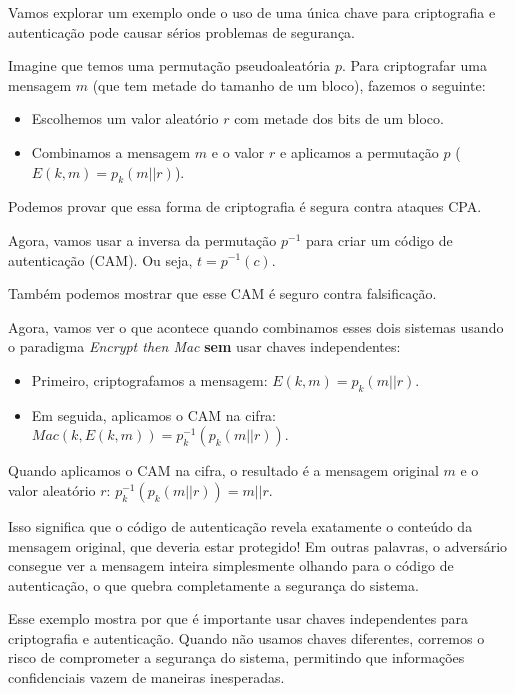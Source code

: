 \begin{example}
Vamos explorar um exemplo onde o uso de uma única chave para criptografia e autenticação pode causar sérios problemas de segurança.

Imagine que temos uma permutação pseudoaleatória $p$.
Para criptografar uma mensagem $m$ (que tem metade do tamanho de um bloco), fazemos o seguinte:
\begin{itemize}
\item Escolhemos um valor aleatório $r$ com metade dos bits de um bloco.
\item Combinamos a mensagem $m$ e o valor $r$ e aplicamos a permutação $p$ ($E(k, m) = p_k(m || r)$).
\end{itemize}

Podemos provar que essa forma de criptografia é segura contra ataques CPA.

Agora, vamos usar a inversa da permutação $p^{-1}$ para criar um código de autenticação (CAM).
Ou seja, $t = p^{-1}(c)$.

Também podemos mostrar que esse CAM é seguro contra falsificação.

Agora, vamos ver o que acontece quando combinamos esses dois sistemas usando o paradigma \textit{Encrypt then Mac} \textbf{sem} usar chaves independentes:

\begin{itemize}
    \item Primeiro, criptografamos a mensagem: $E(k, m) = p_k(m || r)$.
    \item Em seguida, aplicamos o CAM na cifra: $Mac(k, E(k, m)) = p_k^{-1}(p_k(m || r))$.
\end{itemize}

Quando aplicamos o CAM na cifra, o resultado é a mensagem original $m$ e o valor aleatório $r$: $p_k^{-1}(p_k(m || r)) = m || r$.

Isso significa que o código de autenticação revela exatamente o conteúdo da mensagem original, que deveria estar protegido!
Em outras palavras, o adversário consegue ver a mensagem inteira simplesmente olhando para o código de autenticação, o que quebra completamente a segurança do sistema.

Esse exemplo mostra por que é importante usar chaves independentes para criptografia e autenticação.
Quando não usamos chaves diferentes, corremos o risco de comprometer a segurança do sistema, permitindo que informações confidenciais vazem de maneiras inesperadas.

\end{example}

